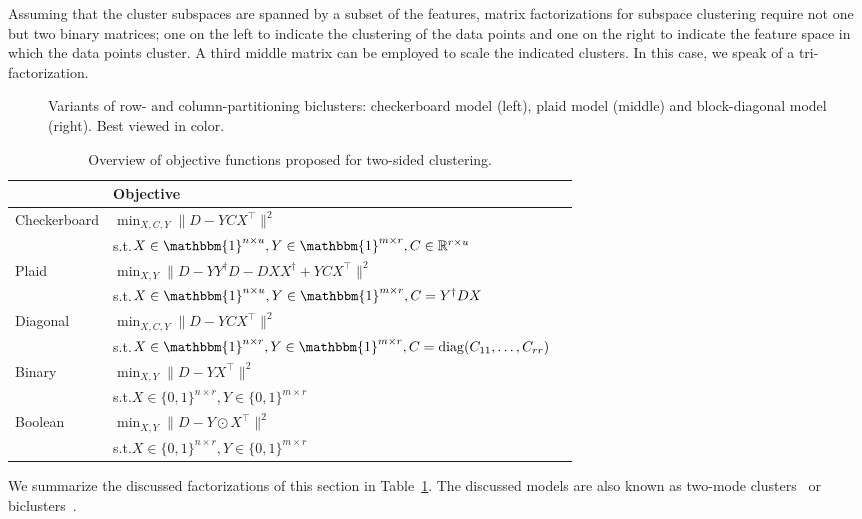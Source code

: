 Assuming that the cluster subspaces are spanned by a subset of the features, matrix factorizations for subspace clustering require not one but two binary matrices; one on the left to indicate the clustering of the data points and one on the right to indicate the feature space in which the data points cluster. A third middle matrix can be employed to scale the indicated clusters. In this case, we speak of a tri-factorization.  
\begin{figure}
    \centering
    
    \caption{Variants of row- and column-partitioning biclusters: checkerboard model (left), plaid model (middle) and block-diagonal model (right). Best viewed in color. }
    \label{fig:blockclusters}
\end{figure}
\begin{table}%
	\centering
    \caption{Overview of objective functions proposed for two-sided clustering.}
	\begin{tabular}{llr}\toprule
 &  Objective &  \\ \midrule
\multirow{2}{*}{Checkerboard}  & $\displaystyle\min_{X,C,Y}\bigl\lVert D-YCX^\top\bigr\rVert ^2$ \\
& s.t.\quad $X\in\mathbbm{1}^{n\times u},Y\in\mathbbm{1}^{m\times r},C\in\mathbb{R}^{r\times u}$\\[1em]
\multirow{2}{*}{Plaid}  & $\displaystyle\min_{X,Y}\bigl\lVert D-YY^\dagger D - DXX^\dagger+YCX^\top \bigr\rVert ^2$\\ 
& s.t.\quad $X\in\mathbbm{1}^{n\times u},Y\in\mathbbm{1}^{m\times r},C=Y^\dagger D X$\\[1em]
\multirow{2}{*}{Diagonal} & $\displaystyle\min_{X,C,Y}\bigl\lVert D-YCX^\top\bigr\rVert ^2$\\ 
& s.t.\quad $X\in\mathbbm{1}^{n\times r},Y\in\mathbbm{1}^{m\times r},C=\diag(C_{11},\ldots,C_{rr})$ \\[1em]
\multirow{2}{*}{Binary} & $\displaystyle\min_{X,Y}\bigl\lVert D-YX^\top\bigr\rVert ^2$ \\
& s.t.\quad $X\in\{0,1\}^{n\times r},Y\in\{0,1\}^{m\times r}$\\[1em]
\multirow{2}{*}{Boolean} & $\displaystyle\min_{X,Y}\bigl\lVert D-Y\odot X^\top\bigr\rVert ^2$\\ 
& s.t.\quad $X\in\{0,1\}^{n\times r},Y\in\{0,1\}^{m\times r}$\\
 \bottomrule
\end{tabular}
\label{tbl:twoSidedClustering}
\end{table}
We summarize the discussed factorizations of this section in Table~\ref{tbl:twoSidedClustering}. The discussed models are also known as two-mode clusters~\citep{van2004two,van2009optimization} or biclusters~\citep{busygin2008biclustering}.
